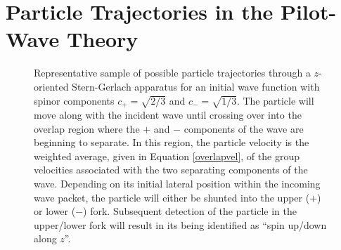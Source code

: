 \documentclass[aps,prc,onecolumn,letterpaper,floatfix,12pt]{revtex4}
\begin{document}
\section{Particle Trajectories in the Pilot-Wave Theory}
\label{sec3}




\begin{figure}[t]
\begin{center}
\scalebox{1.3}{

}
\caption{
Representative sample of possible particle trajectories through a
$z$-oriented Stern-Gerlach apparatus for an initial wave function with
spinor components $c_+ = \sqrt{2/3}$ and $c_- = \sqrt{1/3}$.  The
particle will move along with the incident wave until crossing over
into the overlap region where the $+$ and $-$ components of the wave
are beginning to separate.  In this region, the particle velocity is
the weighted average, given in Equation \eqref{overlapvel}, of the
group velocities associated with the two separating components of the
wave.  Depending on its initial lateral position within the incoming
wave packet, the particle will either be shunted into the upper ($+$)
or lower ($-$) fork.  Subsequent detection of the particle in the
upper/lower fork will result in its being identified as ``spin up/down
along $z$''.  
\label{fig2}
}
\end{center}
\end{figure}
\end{document}
